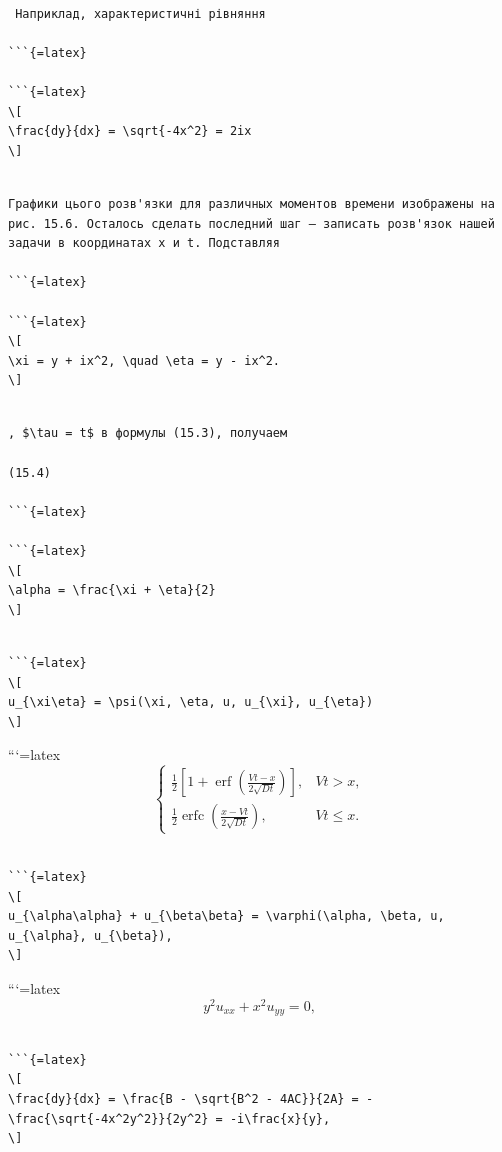 \documentclass[
  ukrainian,
]{article}
\begin{document}
\begin{verbatim}

 Наприклад, характеристичні рівняння

```{=latex}

```{=latex}
\[
\frac{dy}{dx} = \sqrt{-4x^2} = 2ix
\]
\end{verbatim}

\begin{verbatim}

Графики цього розв'язки для различных моментов времени изображены на рис. 15.6. Осталось сделать последний шаг — записать розв'язок нашей задачи в координатах x и t. Подставляя

```{=latex}

```{=latex}
\[
\xi = y + ix^2, \quad \eta = y - ix^2.
\]
\end{verbatim}

\begin{verbatim}

, $\tau = t$ в формулы (15.3), получаем

(15.4)

```{=latex}

```{=latex}
\[
\alpha = \frac{\xi + \eta}{2}
\]
\end{verbatim}

\begin{verbatim}

```{=latex}
\[
u_{\xi\eta} = \psi(\xi, \eta, u, u_{\xi}, u_{\eta})
\]
\end{verbatim}

```{=latex}
\[
\begin{cases} \frac{1}{2} \left[ 1 + \operatorname{erf}\left(\frac{Vt - x}{2\sqrt{Dt}}\right) \right], & Vt > x, \\ \frac{1}{2} \operatorname{erfc}\left(\frac{x - Vt}{2\sqrt{Dt}}\right), & Vt \leq x. \end{cases}
\]

\begin{verbatim}

```{=latex}
\[
u_{\alpha\alpha} + u_{\beta\beta} = \varphi(\alpha, \beta, u, u_{\alpha}, u_{\beta}),
\]
\end{verbatim}

```{=latex}
\[
y^2 u_{xx} + x^2 u_{yy} = 0,
\]

\begin{verbatim}

```{=latex}
\[
\frac{dy}{dx} = \frac{B - \sqrt{B^2 - 4AC}}{2A} = -\frac{\sqrt{-4x^2y^2}}{2y^2} = -i\frac{x}{y},
\]
\end{verbatim}
\end{document}
